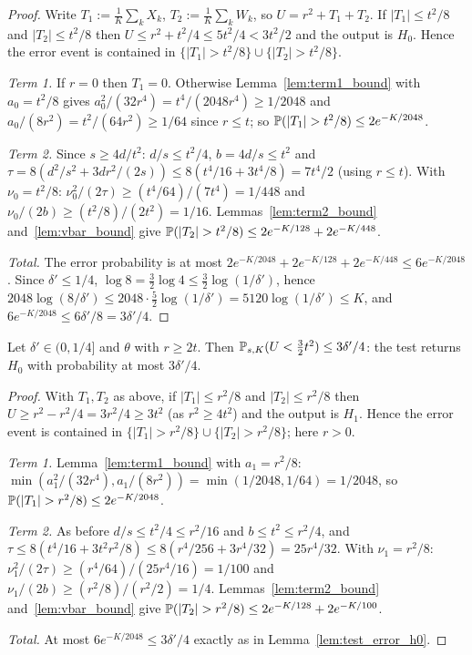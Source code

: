 \begin{proof}
\leanok
{}
Write $T_1 := \frac1K\sum_k X_k$, $T_2 := \frac1K\sum_k W_k$, so $U = r^2 + T_1 + T_2$. If
$|T_1| \le t^2/8$ and $|T_2| \le t^2/8$ then $U \le r^2 + t^2/4 \le 5t^2/4 < 3t^2/2$ and the
output is $H_0$. Hence the error event is contained in
$\{|T_1| > t^2/8\} \cup \{|T_2| > t^2/8\}$.

\emph{Term 1.} If $r = 0$ then $T_1 = 0$. Otherwise Lemma~\ref{lem:term1_bound} with
$a_0 = t^2/8$ gives $a_0^2/(32r^4) = t^4/(2048 r^4) \ge 1/2048$ and
$a_0/(8r^2) = t^2/(64r^2) \ge 1/64$ since $r \le t$; so
$\mathbb{P}(|T_1| > t^2/8) \le 2e^{-K/2048}$.

\emph{Term 2.} Since $s \ge 4d/t^2$: $d/s \le t^2/4$, $b = 4d/s \le t^2$ and
$\tau = 8(d^2/s^2 + 3dr^2/(2s)) \le 8(t^4/16 + 3t^4/8) = 7t^4/2$ (using $r \le t$). With
$\nu_0 = t^2/8$: $\nu_0^2/(2\tau) \ge (t^4/64)/(7t^4) = 1/448$ and
$\nu_0/(2b) \ge (t^2/8)/(2t^2) = 1/16$. Lemmas~\ref{lem:term2_bound} and~\ref{lem:vbar_bound}
give $\mathbb{P}(|T_2| > t^2/8) \le 2e^{-K/128} + 2e^{-K/448}$.

\emph{Total.} The error probability is at most
$2e^{-K/2048} + 2e^{-K/128} + 2e^{-K/448} \le 6e^{-K/2048}$. Since $\delta' \le 1/4$,
$\log 8 = \tfrac32\log 4 \le \tfrac32\log(1/\delta')$, hence
$2048\log(8/\delta') \le 2048\cdot\tfrac52\log(1/\delta') = 5120\log(1/\delta') \le K$, and
$6e^{-K/2048} \le 6\delta'/8 = 3\delta'/4$.
\end{proof}

\begin{lemma}\label{lem:test_error_h1}
\leanok
{}
Let $\delta' \in (0,1/4]$ and $\theta$ with $r \ge 2t$. Then
$\mathbb{P}_{s,K}(U < \tfrac32 t^2) \le 3\delta'/4$: the test returns $H_0$ with probability at
most $3\delta'/4$.
\end{lemma}

\begin{proof}
\leanok
{}
With $T_1, T_2$ as above, if $|T_1| \le r^2/8$ and $|T_2| \le r^2/8$ then
$U \ge r^2 - r^2/4 = 3r^2/4 \ge 3t^2$ (as $r^2 \ge 4t^2$) and the output is $H_1$. Hence the
error event is contained in $\{|T_1| > r^2/8\} \cup \{|T_2| > r^2/8\}$; here $r > 0$.

\emph{Term 1.} Lemma~\ref{lem:term1_bound} with $a_1 = r^2/8$:
$\min(a_1^2/(32r^4), a_1/(8r^2)) = \min(1/2048, 1/64) = 1/2048$, so
$\mathbb{P}(|T_1| > r^2/8) \le 2e^{-K/2048}$.

\emph{Term 2.} As before $d/s \le t^2/4 \le r^2/16$ and $b \le t^2 \le r^2/4$, and
$\tau \le 8(t^4/16 + 3t^2r^2/8) \le 8(r^4/256 + 3r^4/32) = 25r^4/32$. With $\nu_1 = r^2/8$:
$\nu_1^2/(2\tau) \ge (r^4/64)/(25r^4/16) = 1/100$ and $\nu_1/(2b) \ge (r^2/8)/(r^2/2) = 1/4$.
Lemmas~\ref{lem:term2_bound} and~\ref{lem:vbar_bound} give
$\mathbb{P}(|T_2| > r^2/8) \le 2e^{-K/128} + 2e^{-K/100}$.

\emph{Total.} At most $6e^{-K/2048} \le 3\delta'/4$ exactly as in
Lemma~\ref{lem:test_error_h0}.
\end{proof}

